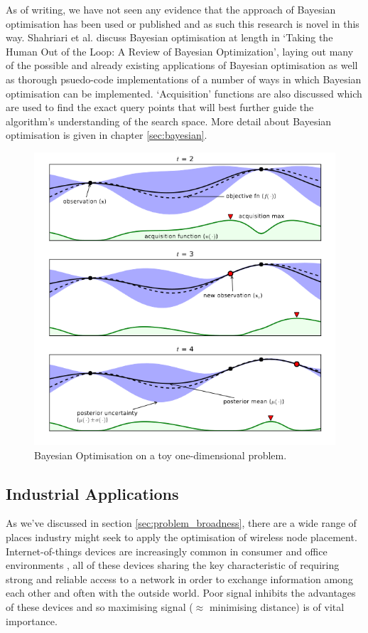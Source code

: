 			As of writing, we have not seen any evidence that the approach of Bayesian optimisation has been used or published and as such this research is novel in this way. Shahriari et al. discuss Bayesian optimisation at length in `Taking the Human Out of the Loop: A Review of Bayesian Optimization'\cite{shahriari2015taking}, laying out many of the possible and already existing applications of Bayesian optimisation as well as thorough psuedo-code implementations of a number of ways in which Bayesian optimisation can be implemented. `Acquisition' functions are also discussed which are used to find the exact query points that will best further guide the algorithm's understanding of the search space. More detail about Bayesian optimisation is given in chapter \ref{sec:bayesian}.
			\begin{figure}[H]
			\centering
			\includegraphics[scale=0.6]{graphics/bayesian_1d}
			\caption{Bayesian Optimisation on a toy one-dimensional problem. \cite{brochu2010tutorial}}
			\label{fig:bayesian_1d}
			\end{figure}
	\subsection{Industrial Applications}
		\label{sec:related_industrial}
		As we've discussed in section \ref{sec:problem_broadness}, there are a wide range of places industry might seek to apply the optimisation of wireless node placement. Internet-of-things devices are increasingly common in consumer and office environments \cite{evans2011internet}, all of these devices sharing the key characteristic of requiring strong and reliable access to a network in order to exchange information among each other and often with the outside world. Poor signal inhibits the advantages of these devices and so maximising signal ($\approx$ minimising distance) is of vital importance.


